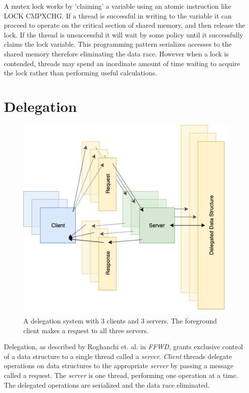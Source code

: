 \documentclass{uicthesi}
\begin{document}
A mutex lock works by 'claiming' a variable using an atomic instruction like LOCK CMPXCHG. If a thread is successful in writing to the variable it can proceed to operate on the critical section of shared memory, and then release the lock. If the thread is unsuccessful it will wait by some policy until it successfully claims the lock variable. This programming pattern serializes accesses to the shared memory therefore eliminating the data race. However when a lock is contended, threads may spend an inordinate amount of time waiting to acquire the lock rather than performing useful calculations. 

\section{Delegation}
\begin{figure}[ht!]
\centering
\includegraphics[width=0.9\columnwidth]{FIG/general_delegation.png}
\caption{A delegation system with 3 clients and 3 servers. The foreground client makes a request to all three servers. }
\label{fig:general_delegation}
\end{figure}
Delegation, as described by Roghanchi et. al. in \textit{FFWD}\cite{FFWD}, grants exclusive control of a data structure to a single thread called a \textit{server}. \textit{Client} threads delegate operations on data structures to the appropriate \textit{server} by passing a message called a request. The \textit{server} is one thread, performing one operation at a time. The delegated operations are serialized and the data race eliminated. 
\end{document}
